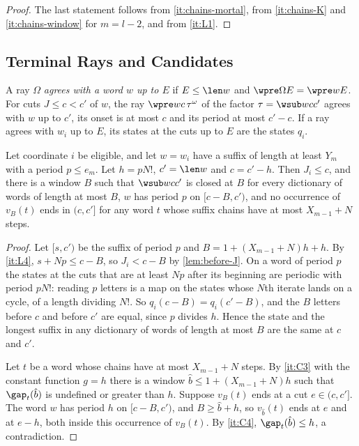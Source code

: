 \begin{proof}
The last statement follows from \eqref{it:chains-mortal}, from
\eqref{it:chains-K} and \eqref{it:chains-window} for $m=l-2$, and from
\ref{it:L1}.
\end{proof}

\subsection{Terminal Rays and Candidates}\label{app:tails-candidates}

A ray $\Omega$ \emph{agrees with a word $w$ up to $E$} if $E\le\len w$ and
$\wpre\Omega E=\wpre wE$. For cuts $J\le c<c'$ of $w$, the ray
$\wpre wc\,\tau^\omega$ of the factor $\tau=\wsub wc{c'}$ agrees with $w$ up
to $c'$, its onset is at most $c$ and its period at most $c'-c$. If a ray
agrees with $w_i$ up to $E$, its states at the cuts up to $E$ are the states
$q_i$.

\begin{lemma}\label{lem:terminal}
Let coordinate $i$ be eligible, and let $w=w_i$ have a suffix of length at
least $Y_m$ with a period $p\le e_m$. Let $h=pN!$, $c'=\len w$ and
$c=c'-h$. Then $J_i\le c$, and there is a window $B$ such that
$\wsub wc{c'}$ is closed at $B$ for every dictionary of words of length at
most $B$, $w$ has period $p$ on $[c-B,c')$, and no occurrence of $v_B(t)$
ends in $(c,c']$ for any word $t$ whose suffix chains have at most
$X_{m-1}+N$ steps.
\end{lemma}

\begin{proof}
Let $[s,c')$ be the suffix of period $p$ and $B=1+(X_{m-1}+N)h+h$. By
\ref{it:L4}, $s+Np\le c-B$, so $J_i<c-B$ by \cref{lem:before-J}. On a word
of period $p$ the states at the cuts that are at least $Np$ after its
beginning are periodic with period $pN!$: reading $p$ letters is a map on
the states whose $N$th iterate lands on a cycle, of a length dividing $N!$.
So $q_i(c-B)=q_i(c'-B)$, and the $B$ letters before $c$ and before $c'$ are
equal, since $p$ divides $h$. Hence the state and the longest suffix in any
dictionary of words of length at most $B$ are the same at $c$ and $c'$.

Let $t$ be a word whose chains have at most $X_{m-1}+N$ steps. By
\ref{it:C3} with the constant function $g=h$ there is a window $\hat b\le
1+(X_{m-1}+N)h$ such that $\gap_t(\hat b)$ is undefined or greater than $h$.
Suppose $v_B(t)$ ends at a cut $e\in(c,c']$. The word $w$ has period $h$ on
$[c-B,c')$, and $B\ge\hat b+h$, so $v_{\hat b}(t)$ ends at $e$ and at $e-h$,
both inside this occurrence of $v_B(t)$. By \ref{it:C4},
$\gap_t(\hat b)\le h$, a contradiction.
\end{proof}

